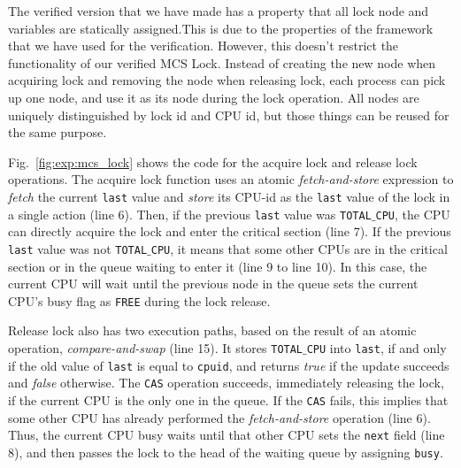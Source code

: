The verified version that we have made has a property that all lock node and variables are statically assigned.This is due to the properties of the framework that we have used for the verification. 
However, this doesn't restrict the functionality of our verified MCS Lock.
Instead of creating the new node when acquiring lock and removing the node when releasing lock, each process can pick up one node, and use it as its node during the lock operation. 
All nodes are uniquely distinguished by lock id and CPU id, but those
things can be reused for the same purpose.

Fig.~\ref{fig:exp:mcs_lock} shows the code for the acquire lock and
release lock operations.  The acquire lock function uses an atomic {\em
fetch-and-store} expression to {\em fetch} the current \texttt{last}
value and {\em store} its CPU-id as the \texttt{last} value of
the lock in a single action (line 6).  Then, if the previous \texttt{last} value
was \texttt{TOTAL$\_$CPU}, the CPU can directly acquire the lock and enter the
critical section (line 7).  If the previous \texttt{last} value was not
\texttt{TOTAL$\_$CPU}, it means that some other CPUs are in the critical
section or in the queue waiting to enter it (line 9 to line 10).  In
this case, the current CPU will wait until the previous node in the
queue sets the current CPU's busy flag as \texttt{FREE} during the lock
release.

Release lock also has two execution paths, based on the result of an atomic operation, {\em compare-and-swap} (line 15).
It stores \texttt{TOTAL$\_$CPU} into \texttt{last}, if and only if the old value
of \texttt{last} is equal to \texttt{cpuid}, and returns {\em
  true} if the update succeeds and {\em false} otherwise.
The \texttt{CAS} operation succeeds, immediately releasing the lock,
if the current CPU is the only one in the queue.
If the \texttt{CAS} fails, this implies that some other CPU has
already performed the {\em fetch-and-store} operation (line 6). Thus, the current CPU busy waits until that other CPU sets the
\texttt{next} field  (line 8), and then passes the lock to the head of the
waiting queue by assigning \texttt{busy}.

